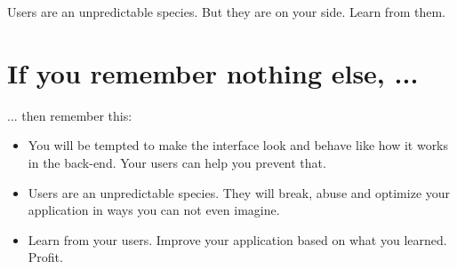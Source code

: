 Users are an unpredictable species. But they are on your side. Learn from them.

\section*{If you remember nothing else, ...}
... then remember this:
\begin{itemize}
 \item You will be tempted to make the interface look and behave like how it
works in the back-end. Your users can help you prevent that.
 \item Users are an unpredictable species. They will break, abuse and optimize
your application in ways you can not even imagine.
 \item Learn from your users. Improve your application based on what you
learned. Profit.
\end{itemize}

